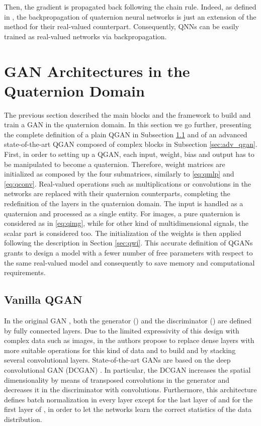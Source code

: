 \documentclass[graybox]{svmult}
\begin{document}
Then, the gradient is propagated back following the chain rule. Indeed, as defined in \cite{ParcolletAIR2019}, the backpropagation of quaternion neural networks is just an extension of the method for their real-valued counterpart. Consequently, QNNs can be easily trained as real-valued networks via backpropagation.


\section{GAN Architectures in the Quaternion Domain}
\label{sec:qgan}
\noindent The previous section described the main blocks and the framework to build and train a GAN in the quaternion domain. In this section we go further, presenting the complete definition of a plain QGAN in Subsection \ref{sec:vanilla_qgan} and of an advanced state-of-the-art QGAN composed of complex blocks in Subsection \ref{sec:adv_qgan}.
First, in order to setting up a QGAN, each input, weight, bias and output has to be manipulated to become a quaternion. Therefore, weight matrices are initialized as composed by the four submatrices, similarly to \eqref{eq:qmlp} and \eqref{eq:qconv}. Real-valued operations such as multiplications or convolutions in the networks are replaced with their quaternion counterparts, completing the redefinition of the layers in the quaternion domain. The input is handled as a quaternion and processed as a single entity. For images, a pure quaternion is considered as in \eqref{eq:qimg}, while for other kind of multidimensional signals, the scalar part is considered too. The initialization of the weights is then applied following the description in Section \ref{sec:qwi}. This accurate definition of QGANs grants to design a model with a fewer number of free parameters with respect to the same real-valued model and consequently to save memory and computational requirements.

\subsection{Vanilla QGAN}
\label{sec:vanilla_qgan}
\noindent In the original GAN \cite{GoodfellowNIPS2014}, both the generator () and the discriminator () are defined by fully connected layers. Due to the limited expressivity of this design with complex data such as images, in \cite{Radford2016UnsupervisedRL} the authors propose to replace dense layers with more suitable operations for this kind of data and to build  and  by stacking several convolutional layers. State-of-the-art GANs are based on the deep convolutional GAN (DCGAN) \cite{Radford2016UnsupervisedRL}. In particular, the DCGAN increases the spatial dimensionality by means of transposed convolutions in the generator and decreases it in the discriminator with convolutions. Furthermore, this architecture defines batch normalization in every layer except for the last layer of  and for the first layer of , in order to let the networks learn the correct statistics of the data distribution. 
\end{document}
